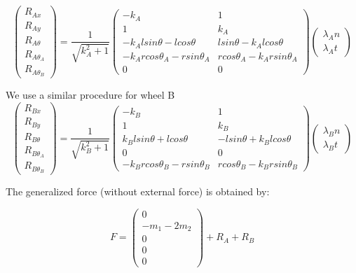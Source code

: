 \begin{equation}
\begin{pmatrix}
R_{Ax}\\ R_{Ay}\\ R_{A\theta} \\R_{A\theta_A}\\ R_{A\theta_B}
\end{pmatrix}=\frac{1}{\sqrt{k_A^2+1}}
\begin{pmatrix}
-k_A & 1 \\
1 & k_A \\
 -k_Alsin\theta-lcos\theta & lsin\theta-k_Alcos\theta \\
 -k_Arcos\theta_A-rsin\theta_A & rcos\theta_A-k_Arsin\theta_A\\
0& 0 \end{pmatrix}
\begin{pmatrix}
\lambda_An \\ \lambda_At
\end{pmatrix}
\end{equation}

We use a similar procedure for wheel B
\begin{equation}
\begin{pmatrix}
R_{Bx}\\ R_{By}\\ R_{B\theta} \\R_{B\theta_A}\\ R_{B\theta_B}
\end{pmatrix}=\frac{1}{\sqrt{k_B^2+1}}
\begin{pmatrix}
 -k_B & 1\\
1 & k_B  \\
k_Blsin\theta+lcos\theta & -lsin\theta+k_Blcos\theta\\
0& 0 \\
-k_Brcos\theta_B-rsin\theta_B & rcos\theta_B-k_Brsin\theta_B
 \end{pmatrix}
\begin{pmatrix}
\lambda_Bn \\ \lambda_Bt
\end{pmatrix}
\end{equation}

The generalized force (without external force) is obtained by:

\begin{equation}
F=\begin{pmatrix}
0 \\ -m_1-2m_2 \\ 0 \\0 \\ 0 \end{pmatrix} +R_A+R_B
\end{equation}

